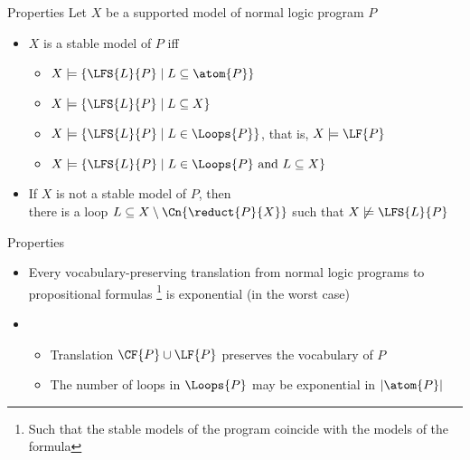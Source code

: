 \begin{frame}{Properties}
  \bigskip
  Let $X$ be a supported model of normal logic program $P$
  \medskip
  \begin{itemize}
  \item<2-> $X$ is a stable model of $P$ iff
    \smallskip
    \begin{itemize}\normalsize
    \item $X\models\{  \LFS{L}{P} \mid L\subseteq\atom{P}  \}$
    \item $X\models\{  \LFS{L}{P} \mid L\subseteq X  \}$
    \item $X\models\{  \LFS{L}{P} \mid L\in\Loops{P}  \}$, that is, $X\models\LF{P}$
    \item $X\models\{  \LFS{L}{P} \mid L\in\Loops{P}\text{ and } L\subseteq X  \}$
    \end{itemize}
    \medskip
  \item<3-> If $X$ is not a stable model of $P$, then\\
    there is a loop $L \subseteq X \setminus \Cn{\reduct{P}{X}}$ such that $X \not\models \LFS{L}{P}$
  \end{itemize}
\end{frame}
\begin{frame}{Properties}
  \bigskip
  \begin{itemize}
  \item<2-> Every vocabulary-preserving translation from normal logic programs to
    propositional formulas%
    \footnote{Such that the stable models of the program coincide with the models of the formula}
    is exponential (in the worst case)
    \medskip
  \item<3-> \
    \begin{itemize}\normalsize
    \item Translation $\CF{P}\cup\LF{P}$ preserves the vocabulary of $P$
      \smallskip
    \item The number of loops in $\Loops{P}$ may be exponential in $|\atom{P}|$
    \end{itemize}
  \end{itemize}
\end{frame}
